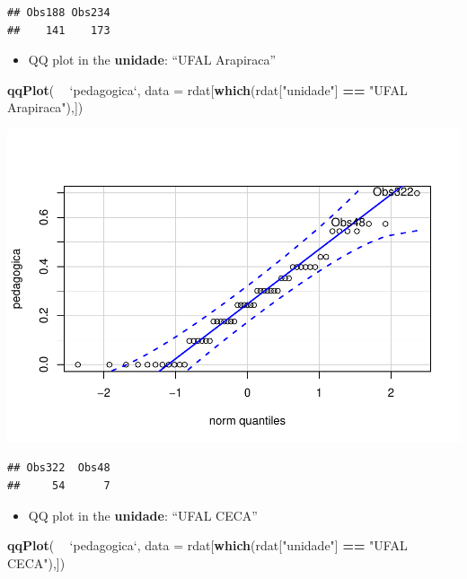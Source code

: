 \documentclass[]{article}
\newenvironment{Shaded}{\begin{snugshade}}{\end{snugshade}}
\newcommand{\DataTypeTok}[1]{\textcolor[rgb]{0.13,0.29,0.53}{#1}}
\newcommand{\KeywordTok}[1]{\textcolor[rgb]{0.13,0.29,0.53}{\textbf{#1}}}
\newcommand{\NormalTok}[1]{#1}
\newcommand{\OperatorTok}[1]{\textcolor[rgb]{0.81,0.36,0.00}{\textbf{#1}}}
\newcommand{\StringTok}[1]{\textcolor[rgb]{0.31,0.60,0.02}{#1}}
\providecommand{\tightlist}{%
  \setlength{\itemsep}{0pt}\setlength{\parskip}{0pt}}
\begin{document}
\begin{verbatim}
## Obs188 Obs234 
##    141    173
\end{verbatim}

\begin{itemize}
\tightlist
\item
  QQ plot in the \textbf{unidade}: ``UFAL Arapiraca''
\end{itemize}

\begin{Shaded}
\begin{Highlighting}[]
\KeywordTok{qqPlot}\NormalTok{( }\OperatorTok{~}\StringTok{ `}\DataTypeTok{pedagogica}\StringTok{`}\NormalTok{, }\DataTypeTok{data =}\NormalTok{ rdat[}\KeywordTok{which}\NormalTok{(rdat[}\StringTok{"unidade"}\NormalTok{] }\OperatorTok{==}\StringTok{ "UFAL Arapiraca"}\NormalTok{),])}
\end{Highlighting}
\end{Shaded}

\includegraphics{factorialAnova_files/figure-latex/unnamed-chunk-13-1.pdf}

\begin{verbatim}
## Obs322  Obs48 
##     54      7
\end{verbatim}

\begin{itemize}
\tightlist
\item
  QQ plot in the \textbf{unidade}: ``UFAL CECA''
\end{itemize}

\begin{Shaded}
\begin{Highlighting}[]
\KeywordTok{qqPlot}\NormalTok{( }\OperatorTok{~}\StringTok{ `}\DataTypeTok{pedagogica}\StringTok{`}\NormalTok{, }\DataTypeTok{data =}\NormalTok{ rdat[}\KeywordTok{which}\NormalTok{(rdat[}\StringTok{"unidade"}\NormalTok{] }\OperatorTok{==}\StringTok{ "UFAL CECA"}\NormalTok{),])}
\end{Highlighting}
\end{Shaded}
\end{document}
